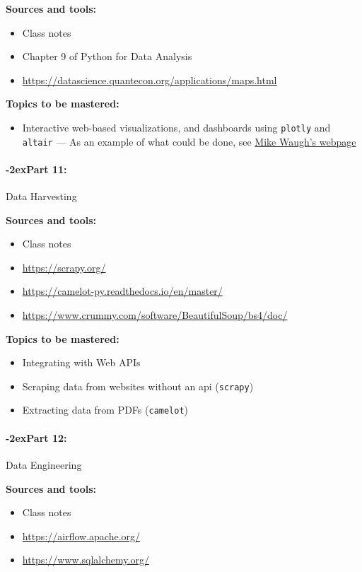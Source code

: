 \documentclass[11pt]{article}
\newcommand{\module}[1]{%
    \paragraph*{\kern-2ex\quad #1:}
  }
\begin{document}
  {\bf Sources and tools:}
  \begin{itemize}
    \item Class notes
    \item Chapter 9 of Python for Data Analysis
    \item \url{https://datascience.quantecon.org/applications/maps.html}
  \end{itemize}

  {\bf Topics to be mastered:}
  \begin{itemize}
    \item Interactive web-based visualizations, and dashboards using \texttt{plotly} and
      \texttt{altair} --- As an example of what could be done, see
      \href{https://www.waugheconomics.com/trade-war-map.html}{Mike Waugh's webpage}
  \end{itemize}

  \module{Part 11} Data Harvesting

  \bigskip

  {\bf Sources and tools:}
  \begin{itemize}
    \item Class notes
    \item \url{https://scrapy.org/}
    \item \url{https://camelot-py.readthedocs.io/en/master/}
    \item \url{https://www.crummy.com/software/BeautifulSoup/bs4/doc/}
  \end{itemize}

  {\bf Topics to be mastered:}
  \begin{itemize}
    \item Integrating with Web APIs
    \item Scraping data from websites without an api (\texttt{scrapy})
    \item Extracting data from PDFs (\texttt{camelot})
  \end{itemize}

  \module{Part 12} Data Engineering

  \bigskip

  {\bf Sources and tools:}
  \begin{itemize}
    \item Class notes
    \item \url{https://airflow.apache.org/}
    \item \url{https://www.sqlalchemy.org/}
  \end{itemize}
\end{document}
